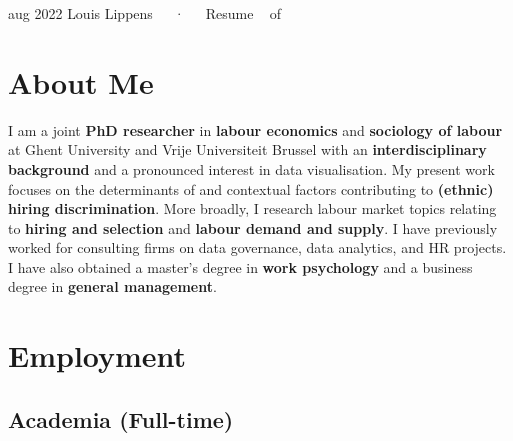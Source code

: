 \documentclass[11pt,a4paper,]{awesome-cv}
\begin{document}
\makecvheader

\makecvfooter
  {aug 2022}
    {Louis Lippens~~~·~~~Resume}
  {\thepage~ of \pageref{LastPage}~}





\hypertarget{about-me}{%
\section{About Me}\label{about-me}}

\footnotesize

I am a joint \textbf{PhD researcher} in \textbf{labour economics} and
\textbf{sociology of labour} at Ghent University and Vrije Universiteit
Brussel with an \textbf{interdisciplinary background} and a pronounced
interest in data visualisation. My present work focuses on the
determinants of and contextual factors contributing to \textbf{(ethnic)
hiring discrimination}. More broadly, I research labour market topics
relating to \textbf{hiring and selection} and \textbf{labour demand and
supply}. I have previously worked for consulting firms on data
governance, data analytics, and HR projects. I have also obtained a
master's degree in \textbf{work psychology} and a business degree in
\textbf{general management}. \normalsize

\hypertarget{employment}{%
\section{Employment}\label{employment}}

\medskip

\hypertarget{academia-full-time}{%
\subsection{Academia (Full-time)}\label{academia-full-time}}
\end{document}
